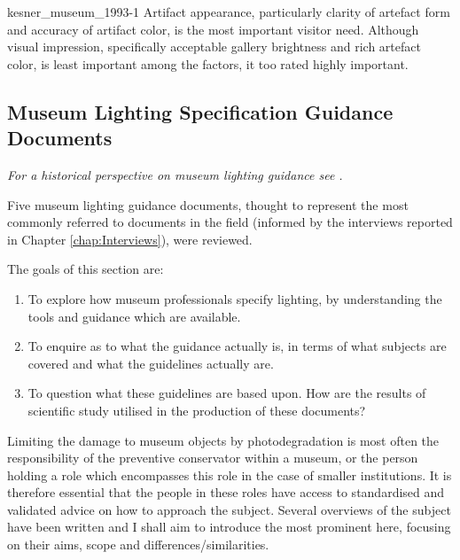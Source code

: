 \begin{citequote}{kesner_museum_1993-1}
Artifact appearance, particularly clarity of artefact form and accuracy of artifact color, is the most important visitor need. Although visual impression, specifically acceptable gallery brightness and rich artefact color, is least important among the factors, it too rated highly important.
\end{citequote}



\subsection{Museum Lighting Specification Guidance Documents}

\textit{For a historical perspective on museum lighting guidance see \citet{druzik_museum_2007}.}

Five museum lighting guidance documents, thought to represent the most commonly referred to documents in the field (informed by the interviews reported in Chapter \ref{chap:Interviews}), were reviewed. 

The goals of this section are:
\begin{enumerate}
\item To explore how museum professionals specify lighting, by understanding the tools and guidance which are available.
\item To enquire as to what the guidance actually is, in terms of what subjects are covered and what the guidelines actually are.
\item To question what these guidelines are based upon. How are the results of scientific study utilised in the production of these documents?
\end{enumerate}

Limiting the damage to museum objects by photodegradation is most often the responsibility of the preventive conservator within a museum, or the person holding a role which encompasses this role in the case of smaller institutions. It is therefore essential that the people in these roles have access to standardised and validated advice on how to approach the subject. Several overviews of the subject have been written and I shall aim to introduce the most prominent here, focusing on their aims, scope and differences/similarities. 

